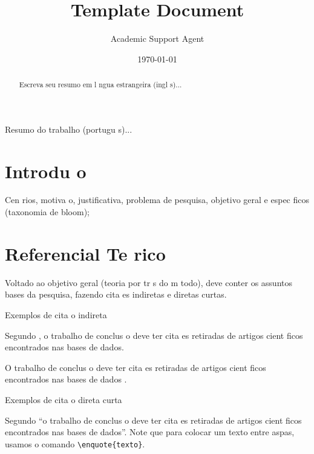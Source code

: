 \documentclass{article}
\title{Template Document}
\author{Academic Support Agent}
\date{\today}
\begin{document}
\maketitle

\maketitle %

\begin{abstract} %
  Escreva seu resumo em l ngua estrangeira (ingl s)...
\end{abstract}
     
\begin{resumo}
  Resumo do trabalho (portugu s)...  
\end{resumo}

\section{Introdu o}
Cen rios, motiva o, justificativa, problema de pesquisa, objetivo geral e espec ficos (taxonomia de bloom);

\section{Referencial Te rico}
Voltado ao objetivo geral (teoria por tr s do m todo), deve conter os assuntos bases da pesquisa, fazendo cita es indiretas e diretas curtas.

\begin{description}
    \item[Exemplos de cita o indireta]    
\end{description}

Segundo \textcite{spinello2024}, o trabalho de conclus o deve ter cita es retiradas de artigos cient ficos encontrados nas bases de dados. 

O trabalho de conclus o deve ter cita es retiradas de artigos cient ficos encontrados nas bases de dados \cite{spinello2024}.

\begin{description}
    \item[Exemplos de cita o direta curta]
\end{description}

Segundo \textcite{spinello2024} \enquote{o trabalho de conclus o deve ter cita es retiradas de artigos cient ficos encontrados nas bases de dados}. Note que para colocar um texto entre aspas, usamos o comando \verb|\enquote{texto}|.
\end{document}
